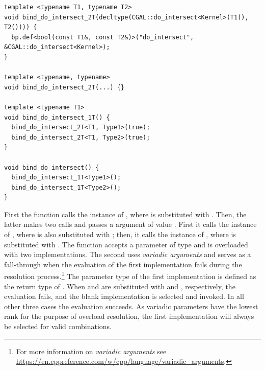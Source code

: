 \begin{lstlisting}[style=cppNumberedStyle]
template <typename T1, typename T2>
void bind_do_intersect_2T(decltype(CGAL::do_intersect<Kernel>(T1(), T2()))) {
  bp.def<bool(const T1&, const T2&)>("do_intersect", &CGAL::do_intersect<Kernel>);
}

template <typename, typename>
void bind_do_intersect_2T(...) {}

template <typename T1>
void bind_do_intersect_1T() {
  bind_do_intersect_2T<T1, Type1>(true);
  bind_do_intersect_2T<T1, Type2>(true);
}

void bind_do_intersect() {
  bind_do_intersect_1T<Type1>();
  bind_do_intersect_1T<Type2>();
}
\end{lstlisting}

First the function  calls the
instance of , where
 is substituted with .  Then, the
latter makes two calls and passes a  argument of
value . First it calls the instance of
, where
 is also substituted with ; then,
it calls the instance of , where  is substituted with
. The function
 accepts a parameter of type
 and is overloaded with two implementations.  The
second uses \emph{variadic arguments} and serves as a fall-through
when the evaluation of the first implementation fails during the
resolution process.\footnote{For more information on \emph{variadic
    arguments} see
  \url{https://en.cppreference.com/w/cpp/language/variadic_arguments}.}
The parameter type of the first implementation is defined as the
return type of . When  and  are substituted
with  and , respectively, the
evaluation fails, and the blank implementation is selected and
invoked.  In all other three cases the evaluation succeeds. As
variadic parameters have the lowest rank for the purpose of overload
resolution, the first implementation will always be selected for
valid combinations.


